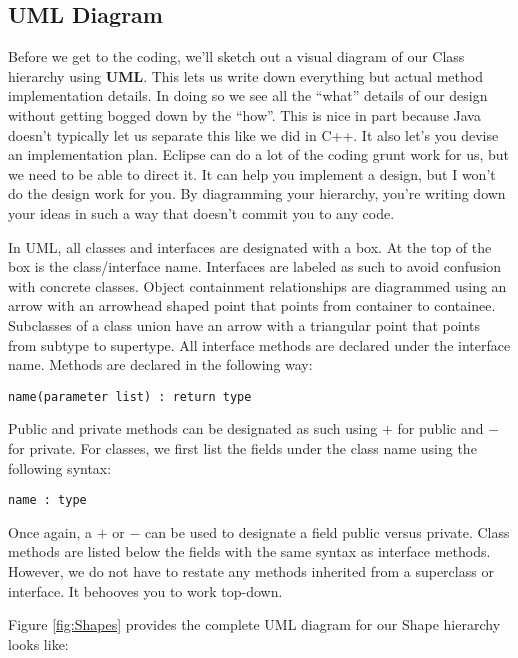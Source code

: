 \documentclass[]{tufte-handout}
\begin{document}
\subsection{UML Diagram}

Before we get to the coding, we'll sketch out a visual diagram of our Class hierarchy using \textbf{UML}. This lets us write down everything but actual method implementation details. In doing so we see all the ``what'' details of our design without getting bogged down by the ``how''.  This is nice in part because Java doesn't typically let us separate this like we did in C++.  It also let's you devise an implementation plan.  Eclipse can do a lot of the coding grunt work for us, but we need to be able to direct it. It can help you implement a design, but I won't do the design work for you. By diagramming your hierarchy, you're writing down your ideas in such a way that doesn't commit you to any code.

In UML, all classes and interfaces are designated with a box. At the top of the box is the class/interface name. Interfaces are labeled as such to avoid confusion with concrete classes. Object containment relationships are diagrammed using an arrow with an arrowhead shaped point that points from container to containee. Subclasses of a class union have an arrow with a triangular point that points from subtype to supertype. 
All interface methods are declared under the interface name. Methods are declared in the following way:
\begin{verbatim}
name(parameter list) : return type
\end{verbatim}
Public and private methods can be designated as such using $+$ for public and $-$ for private. For classes, we first list the fields under the class name using the following syntax:
\begin{verbatim}
name : type
\end{verbatim}
Once again, a $+$ or $-$ can be used to designate a field public versus private. Class methods are listed below the fields with the same syntax as interface methods. However, we do not have to restate any methods inherited from a superclass or interface. It behooves you to work top-down. 

Figure \ref{fig:Shapes} provides the complete UML diagram for our Shape hierarchy looks like:
\end{document}
